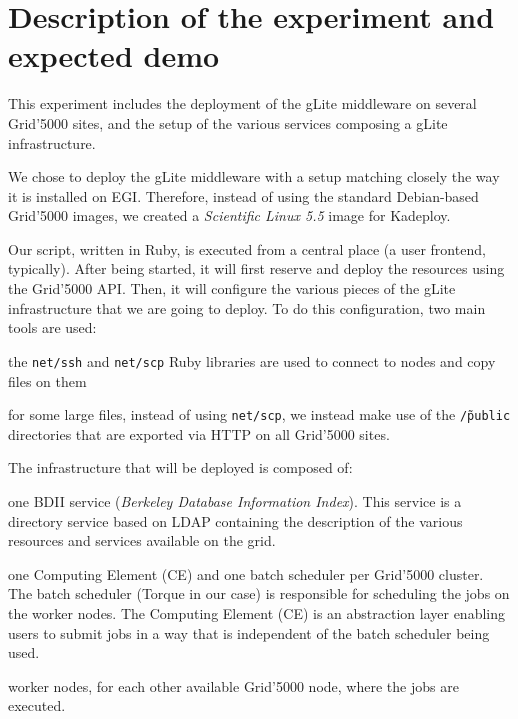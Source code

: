 \documentclass[a4paper, 11pt]{article}
\begin{document}
\section{Description of the experiment and expected demo}

This experiment includes the deployment of the gLite middleware on several
Grid'5000 sites, and the setup of the various services composing a gLite
infrastructure.

We chose to deploy the gLite middleware with a setup matching closely the way
it is installed on EGI. Therefore, instead of using the standard Debian-based
Grid'5000 images, we created a \textsl{Scientific Linux 5.5} image for
Kadeploy.

Our script, written in Ruby, is executed from a central place (a user frontend,
typically).  After being started, it will first reserve and deploy the
resources using the Grid'5000 API. Then, it will configure the various pieces
of the gLite infrastructure that we are going to deploy. To do this
configuration, two main tools are used:

\begin{compactitem}

\item the \texttt{net/ssh} and \texttt{net/scp} Ruby libraries are used to
	connect to nodes and copy files on them

\item for some large files, instead of using \texttt{net/scp}, we instead make
	use of the \texttt{\~/public} directories that are exported via HTTP on
	all Grid'5000 sites.

\end{compactitem}

The infrastructure that will be deployed is composed of:

\begin{compactitem}

\item one BDII service (\textsl{Berkeley Database Information Index}). This
	service is a directory service based on LDAP containing the description
	of the various resources and services available on the grid.

\item one Computing Element (CE) and one batch scheduler per Grid'5000 cluster.
	The batch scheduler (Torque in our case) is responsible for scheduling
	the jobs on the worker nodes. The Computing Element (CE) is an
	abstraction layer enabling users to submit jobs in a way that is
	independent of the batch scheduler being used.

\item worker nodes, for each other available Grid'5000 node, where the jobs are
	executed.

\end{compactitem}
\end{document}
